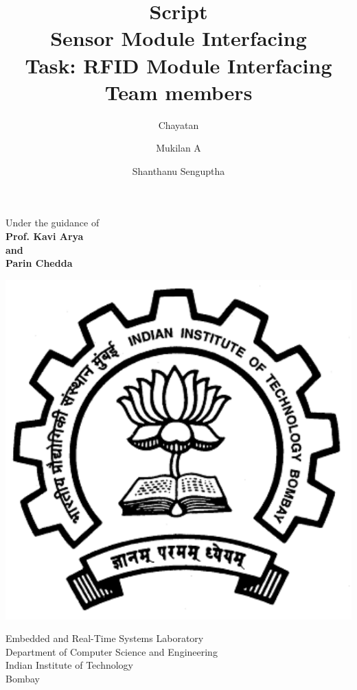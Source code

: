 \documentclass[a4paper,29.6pt]{article}
\title {Script\\Sensor Module Interfacing \\[10pt] Task: RFID Module Interfacing \\[25pt] Team members }
\author {Chayatan \and Mukilan A \and Shanthanu Senguptha}
\begin{document}
\maketitle
\begin{center}
\begin{large}
Under the guidance of\\
\textbf{Prof. Kavi Arya\\and\\Parin Chedda}\\
\vspace{0.5in}
\end{large}
\end{center}
\begin{center}
\includegraphics[scale=0.32]{iitblogo.pdf}
\end{center}
\begin{center}
\begin{large}
Embedded and Real-Time Systems Laboratory \\
Department of Computer Science and Engineering \\
Indian Institute of Technology \\
Bombay \\
\end{large}
\end{center}
\end{document}
